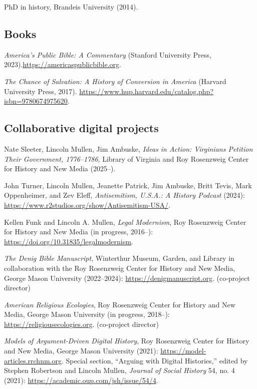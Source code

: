 \documentclass[11pt]{article}
\begin{document}
PhD in history, Brandeis University (2014). 



\subsection{Books}\label{Books}

\emph{America's Public Bible: A Commentary} (Stanford University Press, 2023).\newline\url{https://americaspublicbible.org}.

\emph{The Chance of Salvation: A History of Conversion in America} (Harvard University Press, 2017). \url{https://www.hup.harvard.edu/catalog.php?isbn=9780674975620}.

\subsection{Collaborative digital projects}\label{Digital projects}

Nate Sleeter, Lincoln Mullen, Jim Ambuske, \emph{Ideas in Action: Virginians Petition Their Government, 1776–1786}, Library of Virginia and Roy Rosenzweig Center for History and New Media (2025--).

John Turner, Lincoln Mullen, Jeanette Patrick, Jim Ambuske, Britt Tevis, Mark Oppenheimer, and Zev Eleff, \emph{Antisemitism, U.S.A.: A History Podcast} (2024): \url{https://www.r2studios.org/show/Antisemitism-USA/}.

Kellen Funk and Lincoln A. Mullen, \emph{Legal Modernism}, Roy Rosenzweig Center for History and New Media (in progress, 2016--): \url{https://doi.org/10.31835/legalmodernism}.

\emph{The Denig Bible Manuscript}, Winterthur Museum, Garden, and Library in collaboration with the Roy Rosenzweig Center for History and New Media, George Mason University (2022--2024): \url{https://denigmanuscript.org}. (co-project director)

\emph{American Religious Ecologies}, Roy Rosenzweig Center for History and New Media, George Mason University (in progress, 2018--): \url{https://religiousecologies.org}. (co-project director)

\emph{Models of Argument-Driven Digital History}, Roy Rosenzweig Center for History and New Media, George Mason University (2021): \url{https://model-articles.rrchnm.org}. Special section, ``Arguing with Digital Histories,'' edited by Stephen Robertson and Lincoln Mullen, \emph{Journal of Social History} 54, no. 4 (2021): \url{https://academic.oup.com/jsh/issue/54/4}. 
\end{document}
